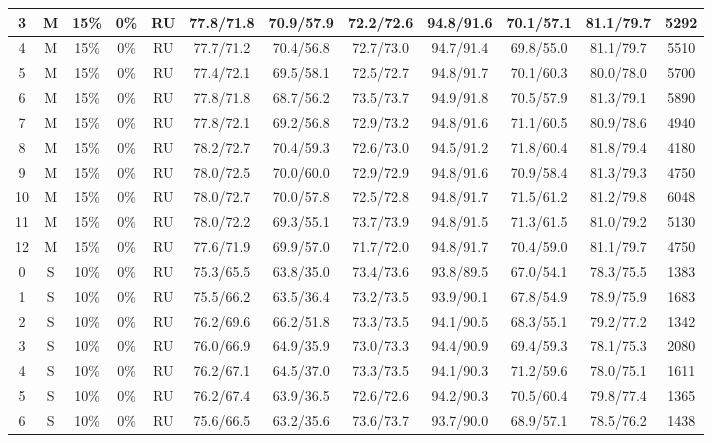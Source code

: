 \begin{table*}
{\begin{tabular}{|c|c|c|c|c||c|c|c|c|c|c||c|}
3 & M & 15\% & 0\% & RU & 77.8/71.8 & 70.9/57.9 & 72.2/72.6 & 94.8/91.6 & 70.1/57.1 & 81.1/79.7 & 5292 \\ \hline
4 & M & 15\% & 0\% & RU & 77.7/71.2 & 70.4/56.8 & 72.7/73.0 & 94.7/91.4 & 69.8/55.0 & 81.1/79.7 & 5510 \\ \hline
5 & M & 15\% & 0\% & RU & 77.4/72.1 & 69.5/58.1 & 72.5/72.7 & 94.8/91.7 & 70.1/60.3 & 80.0/78.0 & 5700 \\ \hline
6 & M & 15\% & 0\% & RU & 77.8/71.8 & 68.7/56.2 & 73.5/73.7 & 94.9/91.8 & 70.5/57.9 & 81.3/79.1 & 5890 \\ \hline
7 & M & 15\% & 0\% & RU & 77.8/72.1 & 69.2/56.8 & 72.9/73.2 & 94.8/91.6 & 71.1/60.5 & 80.9/78.6 & 4940 \\ \hline
8 & M & 15\% & 0\% & RU & 78.2/72.7 & 70.4/59.3 & 72.6/73.0 & 94.5/91.2 & 71.8/60.4 & 81.8/79.4 & 4180 \\ \hline
9 & M & 15\% & 0\% & RU & 78.0/72.5 & 70.0/60.0 & 72.9/72.9 & 94.8/91.6 & 70.9/58.4 & 81.3/79.3 & 4750 \\ \hline
10 & M & 15\% & 0\% & RU & 78.0/72.7 & 70.0/57.8 & 72.5/72.8 & 94.8/91.7 & 71.5/61.2 & 81.2/79.8 & 6048 \\ \hline
11 & M & 15\% & 0\% & RU & 78.0/72.2 & 69.3/55.1 & 73.7/73.9 & 94.8/91.5 & 71.3/61.5 & 81.0/79.2 & 5130 \\ \hline
12 & M & 15\% & 0\% & RU & 77.6/71.9 & 69.9/57.0 & 71.7/72.0 & 94.8/91.7 & 70.4/59.0 & 81.1/79.7 & 4750 \\ \hline
0 & S & 10\% & 0\% & RU & 75.3/65.5 & 63.8/35.0 & 73.4/73.6 & 93.8/89.5 & 67.0/54.1 & 78.3/75.5 & 1383 \\ \hline
1 & S & 10\% & 0\% & RU & 75.5/66.2 & 63.5/36.4 & 73.2/73.5 & 93.9/90.1 & 67.8/54.9 & 78.9/75.9 & 1683 \\ \hline
2 & S & 10\% & 0\% & RU & 76.2/69.6 & 66.2/51.8 & 73.3/73.5 & 94.1/90.5 & 68.3/55.1 & 79.2/77.2 & 1342 \\ \hline
3 & S & 10\% & 0\% & RU & 76.0/66.9 & 64.9/35.9 & 73.0/73.3 & 94.4/90.9 & 69.4/59.3 & 78.1/75.3 & 2080 \\ \hline
4 & S & 10\% & 0\% & RU & 76.2/67.1 & 64.5/37.0 & 73.3/73.5 & 94.1/90.3 & 71.2/59.6 & 78.0/75.1 & 1611 \\ \hline
5 & S & 10\% & 0\% & RU & 76.2/67.4 & 63.9/36.5 & 72.6/72.6 & 94.2/90.3 & 70.5/60.4 & 79.8/77.4 & 1365 \\ \hline
6 & S & 10\% & 0\% & RU & 75.6/66.5 & 63.2/35.6 & 73.6/73.7 & 93.7/90.0 & 68.9/57.1 & 78.5/76.2 & 1438 \\ \hline

\end{tabular}}
\end{table*}
